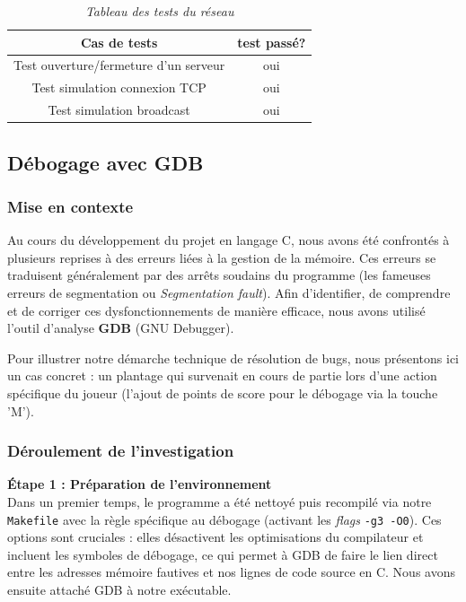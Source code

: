 \documentclass[a4paper,11pt]{article}
\begin{document}
\bigskip

\begin{table}[H]
    \centering
    \begin{tabular}{|c|c|}
        \hline
        Cas de tests & test passé? \\
        \hline
        Test ouverture/fermeture d'un serveur & oui \\
        \hline
        Test simulation connexion TCP & oui \\
        \hline
        Test simulation broadcast & oui \\
        \hline
    \end{tabular}
    \caption{\emph{Tableau des tests du réseau}}
    \label{testReseau}
\end{table}

\subsection{Débogage avec GDB}

\subsubsection*{Mise en contexte}
Au cours du développement du projet en langage C, nous avons été confrontés à plusieurs reprises à des erreurs liées à la gestion de la mémoire. Ces erreurs se traduisent généralement par des arrêts soudains du programme (les fameuses erreurs de segmentation ou \emph{Segmentation fault}). Afin d'identifier, de comprendre et de corriger ces dysfonctionnements de manière efficace, nous avons utilisé l'outil d'analyse \textbf{GDB} (GNU Debugger). 

Pour illustrer notre démarche technique de résolution de bugs, nous présentons ici un cas concret : un plantage qui survenait en cours de partie lors d'une action spécifique du joueur (l'ajout de points de score pour le débogage via la touche 'M').

\subsubsection*{Déroulement de l'investigation}

\textbf{Étape 1 : Préparation de l'environnement} \\
Dans un premier temps, le programme a été nettoyé puis recompilé via notre \texttt{Makefile} avec la règle spécifique au débogage (activant les \emph{flags} \texttt{-g3 -O0}). Ces options sont cruciales : elles désactivent les optimisations du compilateur et incluent les symboles de débogage, ce qui permet à GDB de faire le lien direct entre les adresses mémoire fautives et nos lignes de code source en C. Nous avons ensuite attaché GDB à notre exécutable.
\end{document}
